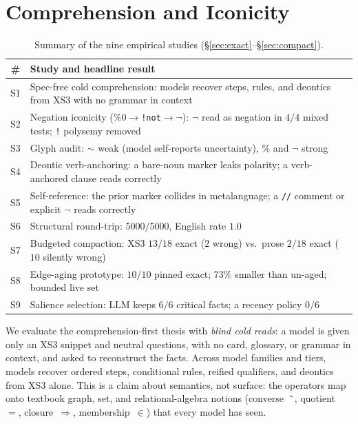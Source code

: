\documentclass[conference]{IEEEtran}
\newcommand{\code}[1]{\texttt{#1}}
\begin{document}
\section{Comprehension and Iconicity}\label{sec:comp}

\begin{table}[t]
\caption{Summary of the nine empirical studies (\S\ref{sec:exact}--\S\ref{sec:compact}).}
\label{tab:studies}
\centering\small
\begin{tabular}{@{}cp{6.6cm}@{}}
\toprule
\# & Study and headline result \\
\midrule
S1 & Spec-free cold comprehension: models recover steps, rules, and deontics from XS3 with no grammar in context \\
S2 & Negation iconicity ($\%0\!\to\!$\code{!not}$\to\neg$): $\neg$ read as negation in $4/4$ mixed tests; \code{!} polysemy removed \\
S3 & Glyph audit: $\sim$ weak (model self-reports uncertainty), $\%$ and $\neg$ strong \\
S4 & Deontic verb-anchoring: a bare-noun marker leaks polarity; a verb-anchored clause reads correctly \\
S5 & Self-reference: the prior marker collides in metalanguage; a \code{//} comment or explicit $\neg$ reads correctly \\
S6 & Structural round-trip: $5000/5000$, English rate $1.0$ \\
S7 & Budgeted compaction: XS3 $13/18$ exact ($2$ wrong) vs.\ prose $2/18$ exact ($10$ silently wrong) \\
S8 & Edge-aging prototype: $10/10$ pinned exact; $73\%$ smaller than un-aged; bounded live set \\
S9 & Salience selection: LLM keeps $6/6$ critical facts; a recency policy $0/6$ \\
\bottomrule
\end{tabular}
\end{table}

We evaluate the comprehension-first thesis with \emph{blind cold reads}: a model
is given only an XS3 snippet and neutral questions, with no card, glossary, or
grammar in context, and asked to reconstruct the facts. Across model families and
tiers, models recover ordered steps, conditional rules, reified qualifiers, and
deontics from XS3 alone. This is a claim about semantics, not surface: the
operators map onto textbook graph, set, and relational-algebra notions
(converse~$\code{\^{}}$, quotient~$=$, closure~$\Rightarrow$, membership~$\in$)
that every model has seen.
\end{document}
